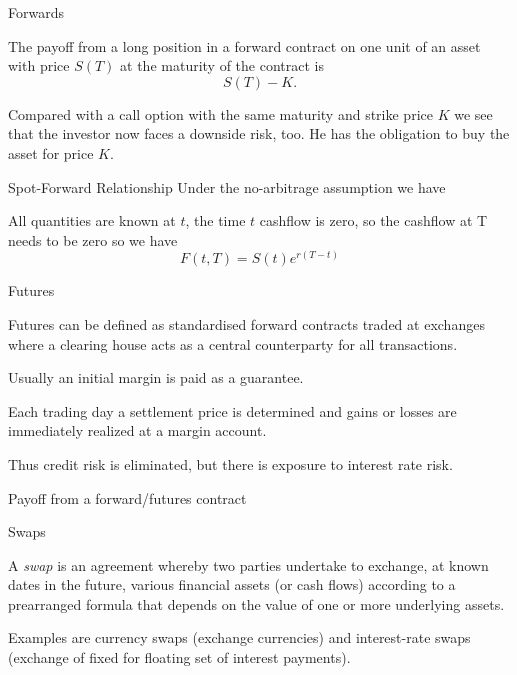 {Forwards}
\item<1->
The payoff from a long position in a forward contract on one unit
of an asset with price $S(T)$ at the maturity of the contract is
$$ S(T)-K.$$
\item<2-> Compared with a call option with the same maturity
and strike price $K$ we see that the investor now faces a downside
risk, too. He has the obligation to buy the asset for price $K$.

{Spot-Forward Relationship}
Under the no-arbitrage assumption we have

\begin{center}
\end{center}

All quantities are known at $t$, the time $t$ cashflow is zero, so the cashflow at T needs to be zero so we have $$F(t,T) = S(t)e^{r(T-t)}$$

{Futures}
\item<1-> Futures can be defined as standardised forward contracts traded at exchanges where a clearing house acts as a central counterparty for all transactions.
\item<2-> Usually an initial margin is paid as a guarantee.
\item<3-> Each trading day a settlement price is determined and gains or losses are immediately realized at a margin account.
\item<4-> Thus credit risk is eliminated, but there is exposure to interest rate risk.


{Payoff from a forward/futures contract}
\begin{figure}
  \centering
   \qquad
\end{figure}

{Swaps}
\item<1->
A {\it swap} is an agreement whereby two parties
undertake to exchange, at known dates in the future, various
financial assets (or cash flows) according to a prearranged
formula that depends on the value of one or more underlying
assets.
\item<2->
Examples are currency swaps (exchange currencies) and
interest-rate swaps (exchange of fixed for floating set of
interest payments).

